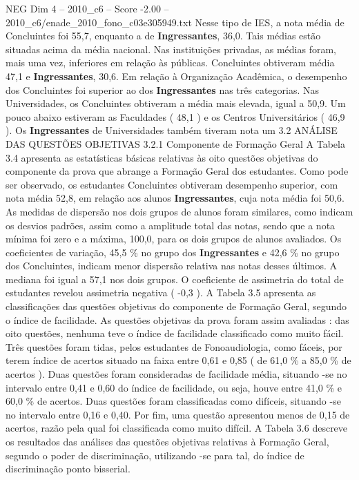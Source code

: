 \begin{textsample}{NEG Dim 4 – 2010\_c6 – Score -2.00 – 2010\_c6/enade\_2010\_fono\_c03e305949.txt}
Nesse tipo de IES, a nota média de Concluintes foi 55,7, enquanto a de \textbf{Ingressantes}, 36,0.
Tais médias estão situadas acima da média nacional.
Nas instituições privadas, as médias foram, mais uma vez, inferiores em relação às públicas.
Concluintes obtiveram média 47,1 e \textbf{Ingressantes}, 30,6.
Em relação à Organização Acadêmica, o desempenho dos Concluintes foi superior ao dos \textbf{Ingressantes} nas três categorias.
Nas Universidades, os Concluintes obtiveram a média mais elevada, igual a 50,9.
Um pouco abaixo estiveram as Faculdades ( 48,1 ) e os Centros Universitários ( 46,9 ).
Os \textbf{Ingressantes} de Universidades também tiveram nota um 3.2 ANÁLISE DAS QUESTÕES OBJETIVAS 3.2.1 Componente de Formação Geral A Tabela 3.4 apresenta as estatísticas básicas relativas às oito questões objetivas do componente da prova que abrange a Formação Geral dos estudantes.
Como pode ser observado, os estudantes Concluintes obtiveram desempenho superior, com nota média 52,8, em relação aos alunos \textbf{Ingressantes}, cuja nota média foi 50,6.
As medidas de dispersão nos dois grupos de alunos foram similares, como indicam os desvios padrões, assim como a amplitude total das notas, sendo que a nota mínima foi zero e a máxima, 100,0, para os dois grupos de alunos avaliados.
Os coeficientes de variação, 45,5 \% no grupo dos \textbf{Ingressantes} e 42,6 \% no grupo dos Concluintes, indicam menor dispersão relativa nas notas desses últimos.
A mediana foi igual a 57,1 nos dois grupos.
O coeficiente de assimetria do total de estudantes revelou assimetria negativa ( -0,3 ).
A Tabela 3.5 apresenta as classificações das questões objetivas do componente de Formação Geral, segundo o índice de facilidade.
As questões objetivas da prova foram assim avaliadas : das oito questões, nenhuma teve o índice de facilidade classificado como muito fácil.
Três questões foram tidas, pelos estudantes de Fonoaudiologia, como fáceis, por terem índice de acertos situado na faixa entre 0,61 e 0,85 ( de 61,0 \% a 85,0 \% de acertos ).
Duas questões foram consideradas de facilidade média, situando -se no intervalo entre 0,41 e 0,60 do índice de facilidade, ou seja, houve entre 41,0 \% e 60,0 \% de acertos.
Duas questões foram classificadas como difíceis, situando -se no intervalo entre 0,16 e 0,40.
Por fim, uma questão apresentou menos de 0,15 de acertos, razão pela qual foi classificada como muito difícil.
A Tabela 3.6 descreve os resultados das análises das questões objetivas relativas à Formação Geral, segundo o poder de discriminação, utilizando -se para tal, do índice de discriminação ponto bisserial.

\end{textsample}

